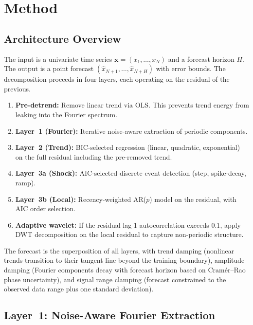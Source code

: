 \documentclass[sigconf,nonacm]{acmart}
\begin{document}
\section{Method}

\subsection{Architecture Overview}

The input is a univariate time series $\mathbf{x} = (x_1, \ldots, x_N)$ and a forecast horizon $H$. The output is a point forecast $(\hat{x}_{N+1}, \ldots, \hat{x}_{N+H})$ with error bounds. The decomposition proceeds in four layers, each operating on the residual of the previous.

\begin{enumerate}
\item \textbf{Pre-detrend:} Remove linear trend via OLS. This prevents trend energy from leaking into the Fourier spectrum.
\item \textbf{Layer~1 (Fourier):} Iterative noise-aware extraction of periodic components.
\item \textbf{Layer~2 (Trend):} BIC-selected regression (linear, quadratic, exponential) on the full residual including the pre-removed trend.
\item \textbf{Layer~3a (Shock):} AIC-selected discrete event detection (step, spike-decay, ramp).
\item \textbf{Layer~3b (Local):} Recency-weighted AR($p$) model on the residual, with AIC order selection.
\item \textbf{Adaptive wavelet:} If the residual lag-1 autocorrelation exceeds $0.1$, apply DWT decomposition on the local residual to capture non-periodic structure.
\end{enumerate}

The forecast is the superposition of all layers, with trend damping (nonlinear trends transition to their tangent line beyond the training boundary), amplitude damping (Fourier components decay with forecast horizon based on Cram\'er--Rao phase uncertainty), and signal range clamping (forecast constrained to the observed data range plus one standard deviation).

\subsection{Layer~1: Noise-Aware Fourier Extraction}
\end{document}
